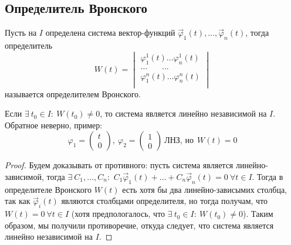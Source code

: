    \subsection*{Определитель Вронского}

    \begin{definition}
        Пусть на $I$ определена система вектор-функций $\vec \varphi_1(t), \dots, \vec \varphi_n(t)$, тогда определитель
        \begin{equation*}
            W(t) = 
            \begin{vmatrix}
                \varphi^1_1(t) \dots \varphi^1_n(t) \\
                \dots ~~~~~~~~ \dots \\
                \varphi^n_1(t) \dots \varphi^n_n(t) \\
            \end{vmatrix}
        \end{equation*}
        называется определителем Вронского.
    \end{definition}

    \begin{theorem}
        Если $\exists ~ t_0 \in I : ~ W(t_0) \neq 0$, то система является линейно независимой на $I$. Обратное неверно,
        пример:
        \begin{equation*}
            \varphi_1 = 
            \begin{pmatrix}
                t \\
                0
            \end{pmatrix}, ~
            \varphi_2 = 
            \begin{pmatrix}
                1 \\
                0
            \end{pmatrix} ~ \text{ЛНЗ, но} ~~ W(t) = 0
        \end{equation*}
    \end{theorem}

    \begin{proof}
        Будем доказывать от противного: пусть система является линейно-зависимой, тогда $\exists ~ C_1, \dots, C_n:$
        $C_1 \vec \varphi_1(t) + \dots + C_n \vec \varphi_n(t) = 0 ~ \forall t \in I$. Тогда в определителе Вронского $W(t)$
        есть хотя бы два линейно-зависымих столбца, так как $\vec \varphi_i(t)$ являются столбцами определителя, но тогда получам, что
        $W(t) = 0 ~ \forall t \in I$ (хотя предпологалось, что $\exists ~ t_0 \in I : ~ W(t_0) \neq 0$). Таким образом, мы получили противоречие,
        откуда следует, что система является линейно независимой на $I$.
    \end{proof}

